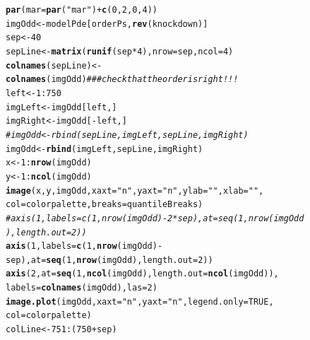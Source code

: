 \documentclass[a4paper]{article}\usepackage[]{graphicx}\usepackage[]{color}
\makeatletter
\newcommand{\hlnum}[1]{\textcolor[rgb]{0.686,0.059,0.569}{#1}}%
\newcommand{\hlstr}[1]{\textcolor[rgb]{0.192,0.494,0.8}{#1}}%
\newcommand{\hlcom}[1]{\textcolor[rgb]{0.678,0.584,0.686}{\textit{#1}}}%
\newcommand{\hlopt}[1]{\textcolor[rgb]{0,0,0}{#1}}%
\newcommand{\hlstd}[1]{\textcolor[rgb]{0.345,0.345,0.345}{#1}}%
\newcommand{\hlkwb}[1]{\textcolor[rgb]{0.69,0.353,0.396}{#1}}%
\newcommand{\hlkwc}[1]{\textcolor[rgb]{0.333,0.667,0.333}{#1}}%
\newcommand{\hlkwd}[1]{\textcolor[rgb]{0.737,0.353,0.396}{\textbf{#1}}}%
\newenvironment{kframe}{%
 \def\at@end@of@kframe{}%
 \ifinner\ifhmode%
  \def\at@end@of@kframe{\end{minipage}}%
  \begin{minipage}{\columnwidth}%
 \fi\fi%
 \def\FrameCommand##1{\hskip\@totalleftmargin \hskip-\fboxsep
 \colorbox{shadecolor}{##1}\hskip-\fboxsep
     \hskip-\linewidth \hskip-\@totalleftmargin \hskip\columnwidth}%
 \MakeFramed {\advance\hsize-\width
   \@totalleftmargin\z@ \linewidth\hsize
   \@setminipage}}%
 {\par\unskip\endMakeFramed%
 \at@end@of@kframe}
\newenvironment{knitrout}{}{} %
\makeatother
\begin{document}
\begin{figure}[htbp]
\begin{center}
\begin{knitrout}
\color{fgcolor}\begin{kframe}
\begin{alltt}
\hlkwd{par}\hlstd{(} \hlkwc{mar} \hlstd{=} \hlkwd{par}\hlstd{(} \hlstr{"mar"} \hlstd{)} \hlopt{+} \hlkwd{c}\hlstd{(} \hlnum{0}\hlstd{,} \hlnum{2}\hlstd{,} \hlnum{0}\hlstd{,} \hlnum{4} \hlstd{) )}
\hlstd{imgOdd} \hlkwb{<-} \hlstd{modelPde[orderPs,}\hlkwd{rev}\hlstd{(knockdown)]}
\hlstd{sep} \hlkwb{<-} \hlnum{40}
\hlstd{sepLine} \hlkwb{<-} \hlkwd{matrix}\hlstd{(}\hlkwd{runif}\hlstd{(sep}\hlopt{*}\hlnum{4}\hlstd{),} \hlkwc{nrow}\hlstd{=sep,} \hlkwc{ncol}\hlstd{=}\hlnum{4}\hlstd{)}
\hlkwd{colnames}\hlstd{(sepLine)} \hlkwb{<-} \hlkwd{colnames}\hlstd{(imgOdd)} \hlcom{### check that the order is right!!!}
\hlstd{left} \hlkwb{<-} \hlnum{1}\hlopt{:}\hlnum{750}
\hlstd{imgLeft} \hlkwb{<-} \hlstd{imgOdd[left,]}
\hlstd{imgRight} \hlkwb{<-} \hlstd{imgOdd[}\hlopt{-}\hlstd{left,]}
\hlcom{# imgOdd <- rbind(sepLine, imgLeft, sepLine, imgRight)}
\hlstd{imgOdd} \hlkwb{<-} \hlkwd{rbind}\hlstd{(imgLeft, sepLine, imgRight)}
\hlstd{x} \hlkwb{<-} \hlnum{1}\hlopt{:}\hlkwd{nrow}\hlstd{(imgOdd)}
\hlstd{y} \hlkwb{<-} \hlnum{1}\hlopt{:}\hlkwd{ncol}\hlstd{(imgOdd)}
\hlkwd{image}\hlstd{(x,y,imgOdd,} \hlkwc{xaxt}\hlstd{=}\hlstr{"n"}\hlstd{,} \hlkwc{yaxt}\hlstd{=}\hlstr{"n"}\hlstd{,} \hlkwc{ylab}\hlstd{=}\hlstr{""}\hlstd{,} \hlkwc{xlab}\hlstd{=}\hlstr{""}\hlstd{,}
\hlkwc{col}\hlstd{=colorpalette,} \hlkwc{breaks}\hlstd{=quantileBreaks)}
\hlcom{# axis( 1, labels=c(1, nrow(imgOdd)-2*sep), at=seq(1,nrow(imgOdd),length.out=2))}
\hlkwd{axis}\hlstd{(} \hlnum{1}\hlstd{,} \hlkwc{labels}\hlstd{=}\hlkwd{c}\hlstd{(}\hlnum{1}\hlstd{,} \hlkwd{nrow}\hlstd{(imgOdd)}\hlopt{-}\hlstd{sep),} \hlkwc{at}\hlstd{=}\hlkwd{seq}\hlstd{(}\hlnum{1}\hlstd{,}\hlkwd{nrow}\hlstd{(imgOdd),}\hlkwc{length.out}\hlstd{=}\hlnum{2}\hlstd{))}
\hlkwd{axis}\hlstd{(} \hlnum{2}\hlstd{,} \hlkwc{at}\hlstd{=}\hlkwd{seq}\hlstd{(}\hlnum{1}\hlstd{,}\hlkwd{ncol}\hlstd{(imgOdd),}\hlkwc{length.out}\hlstd{=}\hlkwd{ncol}\hlstd{(imgOdd) ),}
\hlkwc{labels}\hlstd{=} \hlkwd{colnames}\hlstd{( imgOdd ),} \hlkwc{las}\hlstd{=} \hlnum{2} \hlstd{)}
\hlkwd{image.plot}\hlstd{(imgOdd,} \hlkwc{xaxt}\hlstd{=}\hlstr{"n"}\hlstd{,} \hlkwc{yaxt}\hlstd{=}\hlstr{"n"}\hlstd{,} \hlkwc{legend.only}\hlstd{=}\hlnum{TRUE}\hlstd{,}
\hlkwc{col}\hlstd{=colorpalette)}
\hlstd{colLine} \hlkwb{<-} \hlnum{751}\hlopt{:}\hlstd{(}\hlnum{750}\hlopt{+}\hlstd{sep)}

\end{alltt}
\end{kframe}
\end{knitrout}
\end{center}
\end{figure}
\end{document}
